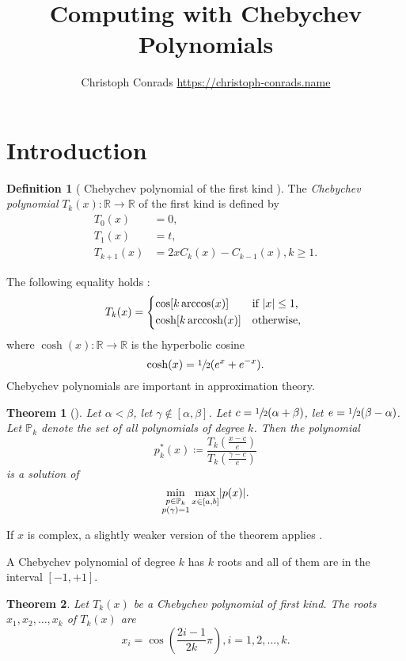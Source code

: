 \documentclass[%
	paper=a4,
	fontsize=10pt,
	DIV11,BCOR10mm,
	numbers=noenddot,
	abstract=yes
]{scrartcl}
\title{Computing with Chebychev Polynomials}
\author{Christoph Conrads {\small \url{https://christoph-conrads.name}}}
\newcommand{\R}{\mathbb{R}}
\DeclarePairedDelimiter\abs{\lvert}{\rvert}
\newtheorem{theorem}{Theorem}[section]
\theoremstyle{definition}
\newtheorem{definition}{Definition}[section]
\begin{document}
\maketitle



\section{Introduction}

\begin{definition}[%
	{Chebychev polynomial of the first kind \cite[§4.4]{Saad2011}}]
	The \emph{Chebychev polynomial} $T_k(x): \R \rightarrow \R$ of the first
	kind is defined by
	\begin{align*}
		T_0(x) &= 0, \\
		T_1(x) &= t, \\
		T_{k+1}(x) &= 2x C_k(x) - C_{k-1}(x), k \geq 1.
	\end{align*}
\end{definition}

The following equality holds \cite[§4.4.1]{Saad2011}:
\[
	T_k(x) =
	\begin{dcases*}
		\cos[k \arccos(x)] & if $\abs{x} \leq 1$, \\
		\cosh[k \operatorname{arccosh}(x)] & otherwise,
	\end{dcases*}
\]
where $\cosh(x): \R \rightarrow \R$ is the hyperbolic cosine
\cite[§13.6]{Kreyszig2011}
\[ \cosh(x) = \sfrac{1}{2} (e^x + e^{-x}). \]
Chebychev polynomials are important in approximation theory.

\begin{theorem}[{\cite[Theorem~4.8]{Saad2011}}]
	Let $\alpha < \beta$, let $\gamma \not\in [\alpha, \beta]$. Let $c =
	\sfrac{1}{2} (\alpha + \beta)$, let $e = \sfrac{1}{2}(\beta - \alpha)$. Let
	$\mathbb{P}_k$ denote the set of all polynomials of degree $k$. Then the
	polynomial
	\[
		p_k^*(x) \coloneqq \frac%
			{T_k \left(\frac{x-c}{e}\right)}
			{T_k \left(\frac{\gamma-c}{e}\right)}
	\]
	is a solution of
	\[
		\min_{\substack{p \in \mathbb{P}_k \\ p(\gamma) = 1}}
		\max_{x \in [a,b]} \abs{p(x)}.
	\]
\end{theorem}

If $x$ is complex, a slightly weaker version of the theorem applies
\cite[Theorem 1]{Fischer1989}.

A Chebychev polynomial of degree $k$ has $k$ roots and all of them are in the
interval $[-1, +1]$.

\begin{theorem}
	Let $T_k(x)$ be a Chebychev polynomial of first kind. The roots $x_1, x_2,
	\dotsc, x_k$ of $T_k(x)$ are
	\[
		x_i = \cos \left( \frac{2i-1}{2k} \pi \right),
		i = 1, 2, \dotsc, k.
	\]
\end{theorem}
\end{document}
